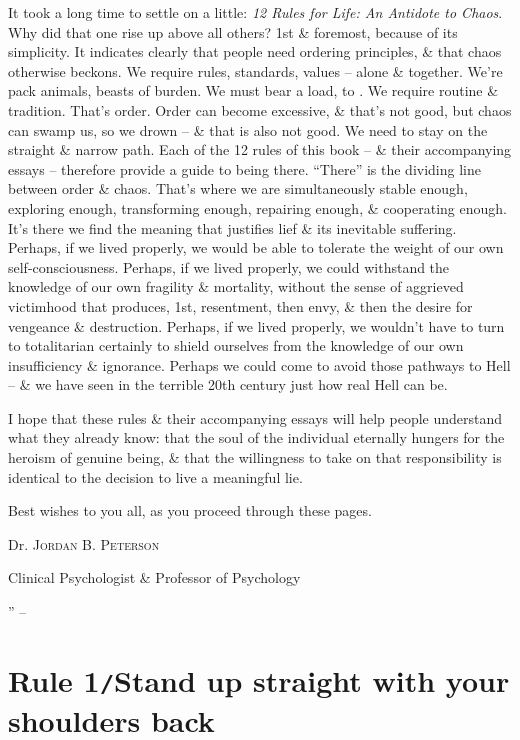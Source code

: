 \documentclass[oneside]{book}
\numberwithin{equation}{section}
\begin{document}
It took a long time to settle on a little: \textit{12 Rules for Life: An Antidote to Chaos}. Why did that one rise up above all others? 1st \& foremost, because of its simplicity. It indicates clearly that people need ordering principles, \& that chaos otherwise beckons. We require rules, standards, values -- alone \& together. We're pack animals, beasts of burden. We must bear a load, to . We require routine \& tradition. That's order. Order can become excessive, \& that's not good, but chaos can swamp us, so we drown -- \& that is also not good. We need to stay on the straight \& narrow path. Each of the 12 rules of this book -- \& their accompanying essays -- therefore provide a guide to being there. ``There'' is the dividing line between order \& chaos. That's where we are simultaneously stable enough, exploring enough, transforming enough, repairing enough, \& cooperating enough. It's there we find the meaning that justifies lief \& its inevitable suffering. Perhaps, if we lived properly, we would be able to tolerate the weight of our own self-consciousness. Perhaps, if we lived properly, we could withstand the knowledge of our own fragility \& mortality, without the sense of aggrieved victimhood that produces, 1st, resentment, then envy, \& then the desire for vengeance \& destruction. Perhaps, if we lived properly, we wouldn't have to turn to totalitarian certainly to shield ourselves from the knowledge of our own insufficiency \& ignorance. Perhaps we could come to avoid those pathways to Hell -- \& we have seen in the terrible 20th century just how real Hell can be.

I hope that these rules \& their accompanying essays will help people understand what they already know: that the soul of the individual eternally hungers for the heroism of genuine being, \& that the willingness to take on that responsibility is identical to the decision to live a meaningful lie.


Best wishes to you all, as you proceed through these pages.
\begin{flushright}
	Dr. \textsc{Jordan B. Peterson}
	
	Clinical Psychologist \& Professor of Psychology
\end{flushright}
'' -- \cite[pp. 20--28]{Peterson2018}

\section{Rule 1\texttt{/}Stand up straight with your shoulders back}
\end{document}
